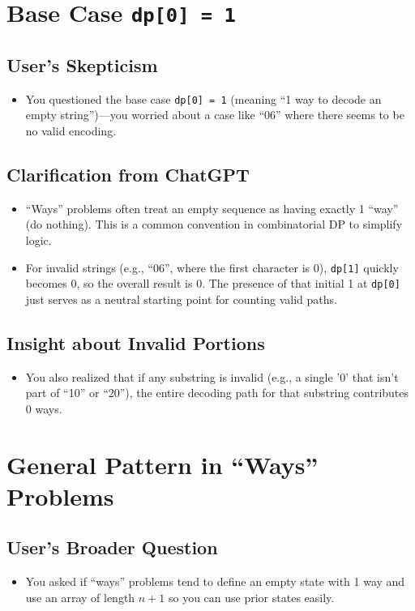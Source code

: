 \documentclass[12pt]{article}
\begin{document}
\section{Base Case \texttt{dp[0] = 1}}

\subsection{User’s Skepticism}
\begin{itemize}[leftmargin=*, label={--}]
    \item You questioned the base case \texttt{dp[0] = 1} (meaning ``1 way to decode an empty string'')---you worried about a case like ``06'' where there seems to be no valid encoding.
\end{itemize}

\subsection{Clarification from ChatGPT}
\begin{itemize}[leftmargin=*, label={--}]
    \item ``Ways'' problems often treat an empty sequence as having exactly 1 ``way'' (do nothing). This is a common convention in combinatorial DP to simplify logic.
    \item For invalid strings (e.g., ``06'', where the first character is 0), \texttt{dp[1]} quickly becomes 0, so the overall result is 0. The presence of that initial 1 at \texttt{dp[0]} just serves as a neutral starting point for counting valid paths.
\end{itemize}

\subsection{Insight about Invalid Portions}
\begin{itemize}[leftmargin=*, label={--}]
    \item You also realized that if any substring is invalid (e.g., a single '0' that isn’t part of ``10'' or ``20''), the entire decoding path for that substring contributes 0 ways.
\end{itemize}

\section{General Pattern in ``Ways'' Problems}

\subsection{User’s Broader Question}
\begin{itemize}[leftmargin=*, label={--}]
    \item You asked if ``ways'' problems tend to define an empty state with 1 way and use an array of length $n + 1$ so you can use prior states easily.
\end{itemize}
\end{document}
